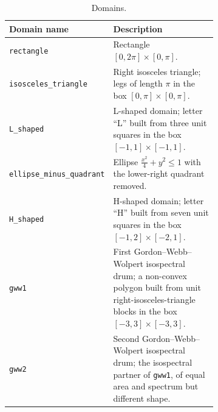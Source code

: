 %

\begin{table}[htbp]
  \centering
  \begin{tabular}{l p{0.68\linewidth}}
    \toprule
    Domain name & Description \\
    \midrule
    \texttt{rectangle} & Rectangle $[0, 2\pi] \times [0, \pi]$. \\
    \texttt{isosceles\_triangle} & Right isosceles triangle; legs of length $\pi$ in the box $[0, \pi] \times [0, \pi]$. \\
    \texttt{L\_shaped} & L-shaped domain; letter ``L'' built from three unit squares in the box $[-1, 1] \times [-1, 1]$. \\
    \texttt{ellipse\_minus\_quadrant} & Ellipse $\frac{x^2}{4} + y^2 \le 1$ with the lower-right quadrant removed. \\
    \texttt{H\_shaped} & H-shaped domain; letter ``H'' built from seven unit squares in the box $[-1, 2] \times [-2, 1]$. \\
    \texttt{gww1} & First Gordon--Webb--Wolpert isospectral drum; a non-convex polygon built from unit right-isosceles-triangle blocks in the box $[-3, 3] \times [-3, 3]$. \\
    \texttt{gww2} & Second Gordon--Webb--Wolpert isospectral drum; the isospectral partner of \texttt{gww1}, of equal area and spectrum but different shape. \\
    \bottomrule
  \end{tabular}
  \caption{Domains.}
  \label{tab:domains_description}
\end{table}
